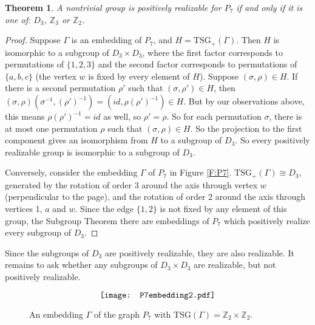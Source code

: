\documentclass[11]{amsart}
\def\Z{\mathbb{Z}}
\def\TSG{{\mathrm{TSG}}}
\newtheorem{theorem}{Theorem}[section]
\theoremstyle{definition}
\theoremstyle{remark}
\begin{document}
\begin{theorem}\label{T:P7op}
A nontrivial group is positively realizable for $P_7$ if and only if it is one of: $D_3$, $\Z_3$ or $\Z_2$.
\end{theorem}
\begin{proof}
Suppose $\Gamma$ is an embedding of $P_7$, and $H = \TSG_+(\Gamma)$.  Then $H$ is isomorphic to a subgroup of $D_3 \times D_3$, where the first factor corresponds to permutations of $\{1, 2, 3\}$ and the second factor corresponds to permutations of $\{a, b, c\}$ (the vertex $w$ is fixed by every element of $H$). Suppose $(\sigma, \rho) \in H$. If there is a second permutation $\rho'$ such that $(\sigma, \rho') \in H$, then $(\sigma, \rho)(\sigma^{-1}, (\rho')^{-1}) = (id, \rho(\rho')^{-1}) \in H$. But by our observations above, this means $\rho(\rho')^{-1} = id$ as well, so $\rho' = \rho$. So for each permutation $\sigma$, there is at most one permutation $\rho$ such that $(\sigma, \rho) \in H$. So the projection to the first component gives an isomorphism from $H$ to a subgroup of $D_3$. So every positively realizable group is isomorphic to a subgroup of $D_3$.

Conversely, consider the embedding $\Gamma$ of $P_7$ in Figure \ref{F:P7}. $\TSG_+(\Gamma) \cong D_3$, generated by the rotation of order 3 around the axis through vertex $w$ (perpendicular to the page), and the rotation of order 2 around the axis through vertices 1, $a$ and $w$.  Since the edge $\{1,2\}$ is not fixed by any element of this group, the Subgroup Theorem there are embeddings of $P_7$ which positively realize every subgroup of $D_3$.
\end{proof}

Since the subgroups of $D_3$ are positively realizable, they are also realizable. It remains to ask whether any subgroups of $D_3 \times D_3$ are realizable, but not positively realizable.

\begin{figure} [htbp]
$$\scalebox{1}{\texttt{[image: P7embedding2.pdf]}}$$
\caption{An embedding $\Gamma$ of the graph $P_7$ with $\TSG(\Gamma) = \Z_2 \times \Z_2$.}
\label{F:P7Z2xZ2}
\end{figure}
\end{document}
